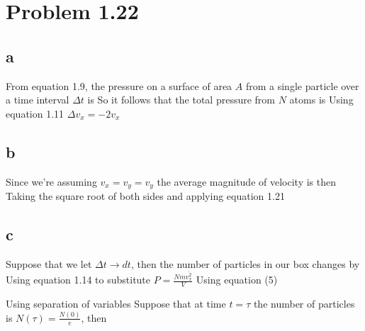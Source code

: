 \section*{Problem 1.22}
\subsection*{a}
From equation 1.9, the pressure on a surface of area $A$ from a single particle over a time interval $\Delta t$ is
So it follows that the total pressure from $N$ atoms is
Using equation 1.11 $\Delta v_x = -2v_x$
\subsection*{b}
Since we're assuming $v_x = v_y = v_y$ the average magnitude of velocity is then
Taking the square root of both sides and applying equation 1.21

\subsection*{c}
Suppose that we let $\Delta t \rightarrow dt$, then the number of particles in our box changes by
Using equation 1.14 to substitute $P = \frac{Nm\overline{v_x^2}}{V}$
Using equation (5)

Using separation of variables
Suppose that at time $t=\tau$ the number of particles is $N(\tau) = \frac{N(0)}{e}$, then
